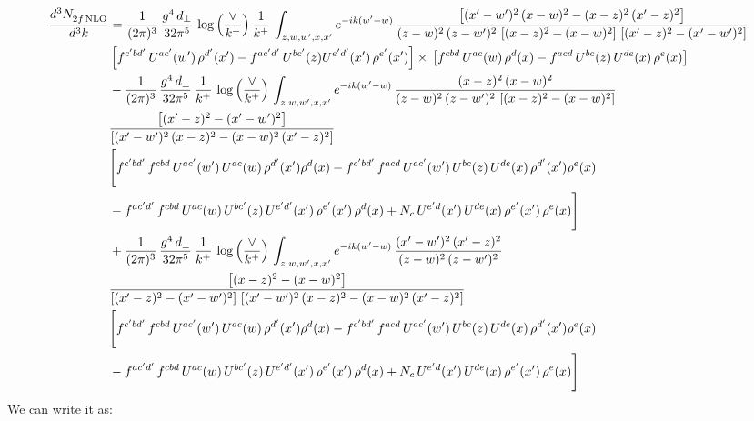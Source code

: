 \documentclass[9pt]{article}
\numberwithin{equation}{section}
\begin{document}
\begin{align}
    \frac{d^{3}N_{2f\,\rm NLO}^{\rm}}{d^{3}k}  & =  \frac{1}{(2\pi)^{3}}\, \frac{g^{4}\,d_{\perp}}{32\pi^{5}}\,\log{\left(\frac{\vee}{k^{+}}\right)}\,\frac{1}{k^{+}}\,\int_{z,w,w^{\prime},x,x'} e^{-ik(w^{\prime}-w)}\,\frac{\left[(x'-w')^{2}\, (x-w)^{2} - (x-z)^{2}\, (x'-z)^{2}\right]}{(z-w)^{2}\, (z-w')^{2}\,\left[(x-z)^{2} - (x-w)^{2}\right]\, \left[(x'-z)^{2} - (x'-w')^{2}\right]}\notag \\ &   \left[f^{c'bd'}\, U^{ac'}(w')\,\rho^{d'}(x')-f^{ac'd'}\, U^{bc'}(z)U^{e'd'}(x')\, \rho^{e'}(x')\right]\times\, \left[f^{cbd}\, U^{ac}(w)\,\rho^{d}(x) - f^{acd}\, U^{bc}(z)\,U^{de}(x)\, \rho^{e}(x)\right]  \notag \\
& - \frac{1}{(2\pi)^{3}}\, \frac{g^{4}\,d_{\perp}}{32\pi^{5}}\,\frac{1}{k^{+}}\,\log{\left(\frac{\vee}{k^{+}}\right)}\,\int_{z,w,w^{\prime},x,x'} e^{-ik(w^{\prime}-w)}\,\frac{(x-z)^{2}\, (x-w)^{2}}{(z-w)^{2}\, (z-w')^{2}\,\left[(x-z)^{2} - (x-w)^{2}\right]}\,\notag \\ & \frac{\left[(x'-z)^{2}-(x'-w')^{2}\right]}{\left[(x'-w')^{2}\, (x-z)^{2} - (x-w)^{2}\, (x'-z)^{2}\right]}\notag \\ & \Bigg[f^{c'bd'}\,f^{cbd}\, U^{ac'}(w')\,U^{ac}(w)\,\rho^{d'}(x')\rho^{d}(x)- f^{c'bd'}\,f^{acd}\,U^{ac'}(w')\,U^{bc}(z)\,U^{de}(x)\,\rho^{d'}(x')\rho^{e}(x) \notag \\ & -f^{ac'd'}\,f^{cbd}\,U^{ac}(w)\,U^{bc'}(z)\,U^{e'd'}(x')\,\rho^{e'}(x')\,\rho^{d}(x) +N_{c}\,U^{e'd}(x')\,U^{de}(x)\,\rho^{e'}(x')\,\rho^{e}(x)\Bigg]  \notag \\ & + \frac{1}{(2\pi)^{3}}\, \frac{g^{4}\,d_{\perp}}{32\pi^{5}}\,\frac{1}{k^{+}}\,\log{\left(\frac{\vee}{k^{+}}\right)}\,\int_{z,w,w^{\prime},x,x'} e^{-ik(w^{\prime}-w)}\,\frac{(x'-w')^{2}\, (x'-z)^{2}}{(z-w)^{2}\, (z-w')^{2}}\notag \\ & \frac{\left[(x-z)^{2} - (x-w)^{2}\right]}{\left[(x'-z)^{2} - (x'-w')^{2}\right]\, \left[(x'-w')^{2}\, (x - z)^{2} - (x-w)^{2}\,(x'-z)^{2}\right]}\, \notag \\ &  \Bigg[f^{c'bd'}\,f^{cbd}\, U^{ac'}(w')\,U^{ac}(w)\,\rho^{d'}(x')\rho^{d}(x)- f^{c'bd'}\,f^{acd}\,U^{ac'}(w')\,U^{bc}(z)\,U^{de}(x)\,\rho^{d'}(x')\rho^{e}(x) \notag \\ & -f^{ac'd'}\,f^{cbd}\,U^{ac}(w)\,U^{bc'}(z)\,U^{e'd'}(x')\,\rho^{e'}(x')\,\rho^{d}(x) +N_{c}\,U^{e'd}(x')\,U^{de}(x)\,\rho^{e'}(x')\,\rho^{e}(x)\Bigg] 
\end{align}
We can write it as:
\end{document}
